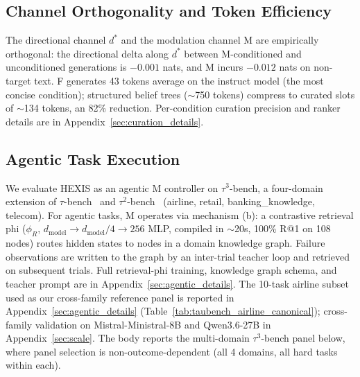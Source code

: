 
\subsection{Channel Orthogonality and Token Efficiency}

The directional channel $d^*$ and the modulation channel M are empirically orthogonal: the directional delta along $d^*$ between M-conditioned and unconditioned generations is $-0.001$ nats, and M incurs $-0.012$ nats on non-target text. F generates 43 tokens average on the instruct model (the most concise condition); structured belief trees ($\sim$750 tokens) compress to curated slots of $\sim$134 tokens, an 82\% reduction. Per-condition curation precision and ranker details are in Appendix~\ref{sec:curation_details}.

\subsection{Agentic Task Execution}
\label{sec:agentic}
\label{sec:agentic_results}

We evaluate HEXIS as an agentic M controller on $\tau^3$-bench, a four-domain extension of $\tau$-bench~\citep{yao2024tau} and $\tau^2$-bench~\citep{barres2025tau2} (airline, retail, banking\_knowledge, telecom). For agentic tasks, M operates via mechanism (b): a contrastive retrieval phi ($\phi_R$, $d_\text{model} \to d_\text{model}/4 \to 256$ MLP, compiled in $\sim$20s, 100\% R@1 on 108 nodes) routes hidden states to nodes in a domain knowledge graph. Failure observations are written to the graph by an inter-trial teacher loop and retrieved on subsequent trials. Full retrieval-phi training, knowledge graph schema, and teacher prompt are in Appendix~\ref{sec:agentic_details}. The 10-task airline subset used as our cross-family reference panel is reported in Appendix~\ref{sec:agentic_details} (Table~\ref{tab:taubench_airline_canonical}); cross-family validation on Mistral-Ministral-8B and Qwen3.6-27B in Appendix~\ref{sec:scale}. The body reports the multi-domain $\tau^3$-bench panel below, where panel selection is non-outcome-dependent (all 4 domains, all hard tasks within each).

